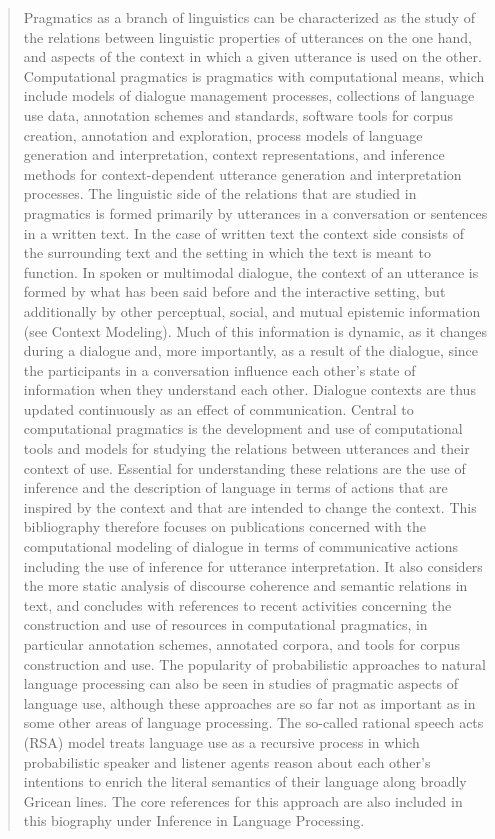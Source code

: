 \begin{quotation}
    Pragmatics as a branch of linguistics can be characterized as the study of
    the relations between linguistic properties of utterances on the one hand,
    and aspects of the context in which a given utterance is used on the other.
    Computational pragmatics is pragmatics with computational means, which
    include models of dialogue management processes, collections of language use
    data, annotation schemes and standards, software tools for corpus creation,
    annotation and exploration, process models of language generation and
    interpretation, context representations, and inference methods for
    context-dependent utterance generation and interpretation processes. The
    linguistic side of the relations that are studied in pragmatics is formed
    primarily by utterances in a conversation or sentences in a written text. In
    the case of written text the context side consists of the surrounding text
    and the setting in which the text is meant to function. In spoken or
    multimodal dialogue, the context of an utterance is formed by what has been
    said before and the interactive setting, but additionally by other
    perceptual, social, and mutual epistemic information (see Context Modeling).
    Much of this information is dynamic, as it changes during a dialogue and,
    more importantly, as a result of the dialogue, since the participants in a
    conversation influence each other’s state of information when they
    understand each other. Dialogue contexts are thus updated continuously as an
    effect of communication. Central to computational pragmatics is the
    development and use of computational tools and models for studying the
    relations between utterances and their context of use. Essential for
    understanding these relations are the use of inference and the description
    of language in terms of actions that are inspired by the context and that
    are intended to change the context. This bibliography therefore focuses on
    publications concerned with the computational modeling of dialogue in terms
    of communicative actions including the use of inference for utterance
    interpretation. It also considers the more static analysis of discourse
    coherence and semantic relations in text, and concludes with references to
    recent activities concerning the construction and use of resources in
    computational pragmatics, in particular annotation schemes, annotated
    corpora, and tools for corpus construction and use. The popularity of
    probabilistic approaches to natural language processing can also be seen in
    studies of pragmatic aspects of language use, although these approaches are
    so far not as important as in some other areas of language processing. The
    so-called rational speech acts (RSA) model treats language use as a
    recursive process in which probabilistic speaker and listener agents reason
    about each other’s intentions to enrich the literal semantics of their
    language along broadly Gricean lines. The core references for this approach
    are also included in this biography under Inference in Language Processing.
\end{quotation}

